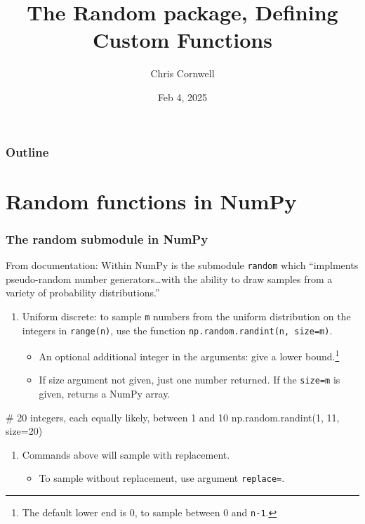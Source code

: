 \documentclass{beamer}
\author{Chris Cornwell}
\date{Feb 4, 2025}
\title{The Random package, Defining Custom Functions}
\newenvironment{codeblock}
    {\hfill\begin{beamerboxesrounded}[lower=codecol, width=0.8\textwidth]
    \medskip

    }
    { 
    \end{beamerboxesrounded}\hfill
    }
\theoremstyle{example}
\newcommand{\ttt}[1]{{\small\texttt{#1}}}
\begin{document}
\begin{frame}
\titlepage
\end{frame}

\begin{frame}
\frametitle{Outline}
\tableofcontents
\end{frame}

\section{Random functions in NumPy}

\begin{frame}[fragile]
\frametitle{The {\ttm random} submodule in NumPy}
From documentation: Within NumPy is the submodule \ttt{random} which ``implments pseudo-random number generators\ldots with the ability to draw samples from a variety of probability distributions.''
\pause
\begin{enumerate}
    \item Uniform discrete: to sample \ttt{m} numbers from the uniform distribution on the integers in \ttt{range(n)}, use the function \ttt{np.random.randint(n, size=m)}. 
    \begin{itemize}
        \item An optional additional integer in the arguments: give a lower bound.\footnote{The default lower end is 0, to sample between 0 and \ttt{n-1}.}
        \pause
        \item If size argument not given, just one number returned. If the \ttt{size=m} is given, returns a NumPy array.
    \end{itemize}
\end{enumerate}

\pause 
\begin{codeblock}

\begin{python}
    # 20 integers, each equally likely, between 1 and 10
    np.random.randint(1, 11, size=20)
\end{python}

\end{codeblock}

\pause
\begin{enumerate}
    \item[] Commands above will sample with replacement.
    \begin{itemize}
        \item To sample without replacement, use argument \ttt{replace=}{\color{numeric}\ttt{False}}.
    \end{itemize}
\end{enumerate}

\end{frame}
\end{document}
